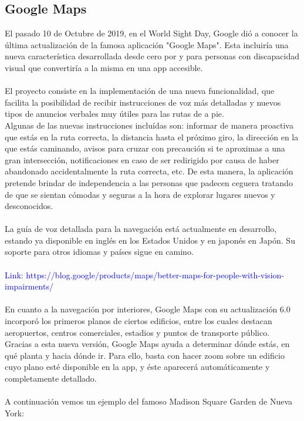 \documentclass{article}
\begin{document}
	\subsection{Google Maps}
		El pasado 10 de Octubre de 2019, en el World Sight Day, Google dió a conocer la última actualización de la famosa aplicación "Google Maps". Esta incluiría una nueva característica desarrollada desde cero por y para personas con discapacidad visual que convertiría a la misma en una app accesible.
		\\
		\\
		El proyecto consiste en la implementación de una nueva funcionalidad, que facilita la posibilidad de recibir instrucciones de voz más detalladas y nuevos tipos de anuncios verbales muy útiles para las rutas de a pie.
		\\
		Algunas de las nuevas instrucciones incluídas son: informar de manera proactiva que estás en la ruta correcta, la distancia hasta el próximo giro, la dirección en la que estás caminando, avisos para cruzar con precaución si te aproximas a una gran intersección, notificaciones en caso de ser redirigido por causa de haber abandonado accidentalmente la ruta correcta, etc. De esta manera, la aplicación pretende brindar de independencia a las personas que padecen ceguera tratando de que se sientan cómodas y seguras a la hora de explorar lugares nuevos y desconocidos.
		\\
		\\
		La guía de voz detallada para la navegación está actualmente en desarrollo, estando ya disponible en inglés en los Estados Unidos y en japonés en Japón. Su soporte para otros idiomas y países sigue en camino.
		\\
		\\
		\textcolor{blue}{Link: https://blog.google/products/maps/better-maps-for-people-with-vision-impairments/}
		\\
		\\
        En cuanto a la navegación por interiores, Google Maps con su actualización 6.0 incorporó los primeros planos de ciertos edificios, entre los cuales destacan aeropuertos, centros comerciales, estadios y puntos de transporte público.
		\\
		Gracias a esta nueva versión, Google Maps ayuda a determinar dónde estás, en qué planta y hacia dónde ir. Para ello, basta con hacer zoom sobre un edificio cuyo plano esté disponible en la app, y éste aparecerá automáticamente y completamente detallado.
		\\
		\\
		A continuación vemos un ejemplo del famoso Madison Square Garden de Nueva York: 
		
\end{document}
